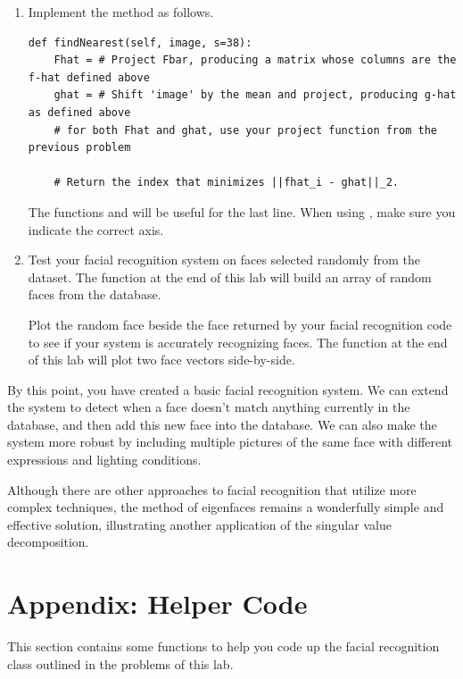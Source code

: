 \begin{problem}
\label{prob:nearest}
\leavevmode
\begin{enumerate}
\item
Implement the method  as follows.
\begin{lstlisting}
def findNearest(self, image, s=38):
    Fhat = # Project Fbar, producing a matrix whose columns are the f-hat defined above 
    ghat = # Shift 'image' by the mean and project, producing g-hat as defined above
    # for both Fhat and ghat, use your project function from the previous problem
    
    # Return the index that minimizes ||fhat_i - ghat||_2.
\end{lstlisting}
The functions  and  will be useful for the last line. When using , make sure you indicate the correct axis. 

\item Test your facial recognition system on faces selected randomly from the  dataset.
The function  at the end of this lab will build an array of  random faces from the  database.

Plot the random face beside the face returned by your facial recognition code to see if your system is accurately recognizing faces.
The function  at the end of this lab will plot two face vectors side-by-side.

\end{enumerate}
\end{problem}


By this point, you have created a basic facial recognition system.
We can extend the system to detect when a face doesn't match anything currently in the database, and then add this new face into the database.
We can also make the system more robust by including multiple pictures of the same face with different expressions and lighting conditions.

Although there are other approaches to facial recognition that utilize more complex techniques, the method of eigenfaces remains
a wonderfully simple and effective solution, illustrating another application of the singular value decomposition.

\section*{Appendix: Helper Code}
This section contains some functions to help you code up the facial recognition class outlined in the problems of this lab.

